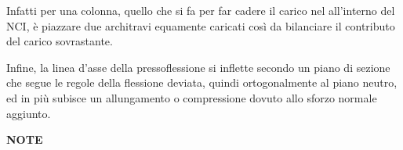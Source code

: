 \documentclass{article}
\begin{document}
\begin{adjustwidth}{2in}{}
		Infatti per una colonna, quello che si fa per far cadere il carico nel all'interno del NCI, è piazzare due architravi equamente caricati così da bilanciare il contributo del carico sovrastante. \newline 
		
		Infine, la linea d'asse della pressoflessione si inflette secondo un piano di sezione che segue le regole della flessione deviata, quindi ortogonalmente al piano neutro, ed in più subisce un allungamento o compressione dovuto allo sforzo normale aggiunto. 
		
		
		
		
	
		
		
		
		
		
		
		
		
		 
		
		
		
	\newpage
	{\Large \textbf{NOTE}}

%		
\end{adjustwidth}
\end{document}
